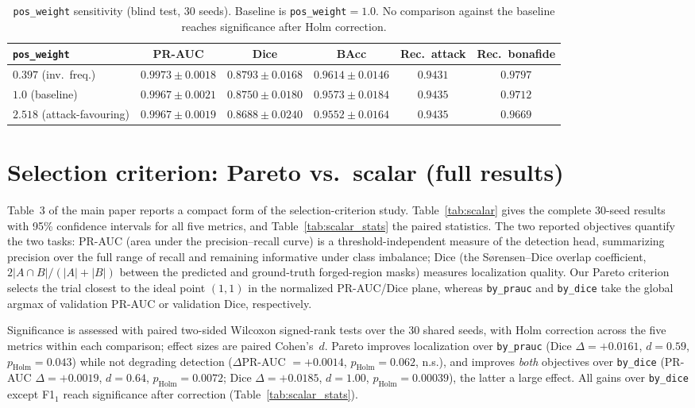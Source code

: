 \documentclass[11pt]{article}
\begin{document}
\begin{table}[h]
  \centering
  \caption{\texttt{pos\_weight} sensitivity (blind test, 30 seeds).
           Baseline is \texttt{pos\_weight}$=1.0$. No comparison against the
           baseline reaches significance after Holm correction.}
  \label{tab:posweight}
  \small
  \setlength{\tabcolsep}{4pt}
  \begin{tabular}{lccccc}
    \toprule
    \texttt{pos\_weight} & PR-AUC & Dice & BAcc & Rec.\ attack & Rec.\ bonafide \\
    \midrule
    $0.397$ (inv.\ freq.)        & $0.9973\pm0.0018$ & $0.8793\pm0.0168$ & $0.9614\pm0.0146$ & $0.9431$ & $0.9797$ \\
    $1.0$ (baseline)             & $0.9967\pm0.0021$ & $0.8750\pm0.0180$ & $0.9573\pm0.0184$ & $0.9435$ & $0.9712$ \\
    $2.518$ (attack-favouring)   & $0.9967\pm0.0019$ & $0.8688\pm0.0240$ & $0.9552\pm0.0164$ & $0.9435$ & $0.9669$ \\
    \bottomrule
  \end{tabular}
\end{table}

\section{Selection criterion: Pareto vs.\ scalar (full results)}
\label{sec:scalar}

Table~3 of the main paper reports a compact form of the selection-criterion
study. Table~\ref{tab:scalar} gives the complete 30-seed results with 95\%
confidence intervals for all five metrics, and Table~\ref{tab:scalar_stats}
the paired statistics. The two reported objectives quantify the two tasks:
PR-AUC (area under the precision--recall curve) is a threshold-independent
measure of the detection head, summarizing precision over the full range of
recall and remaining informative under class imbalance; Dice (the
S\o{}rensen--Dice overlap coefficient, $2|A\cap B|/(|A|+|B|)$ between the
predicted and ground-truth forged-region masks) measures localization
quality. Our Pareto criterion selects the trial closest to the ideal point
$(1,1)$ in the normalized PR-AUC/Dice plane, whereas \texttt{by\_prauc} and
\texttt{by\_dice} take the global argmax of validation PR-AUC or validation
Dice, respectively.

Significance is assessed with paired two-sided Wilcoxon signed-rank tests over
the 30 shared seeds, with Holm correction across the five metrics within each
comparison; effect sizes are paired Cohen's~$d$. Pareto improves localization
over \texttt{by\_prauc} (Dice $\Delta=+0.0161$, $d=0.59$,
$p_{\text{Holm}}=0.043$) while not degrading detection ($\Delta$PR-AUC
$=+0.0014$, $p_{\text{Holm}}=0.062$, n.s.), and improves \emph{both} objectives
over \texttt{by\_dice} (PR-AUC $\Delta=+0.0019$, $d=0.64$,
$p_{\text{Holm}}=0.0072$; Dice $\Delta=+0.0185$, $d=1.00$,
$p_{\text{Holm}}=0.00039$), the latter a large effect. All gains over
\texttt{by\_dice} except F1$_1$ reach significance after correction
(Table~\ref{tab:scalar_stats}).
\end{document}
